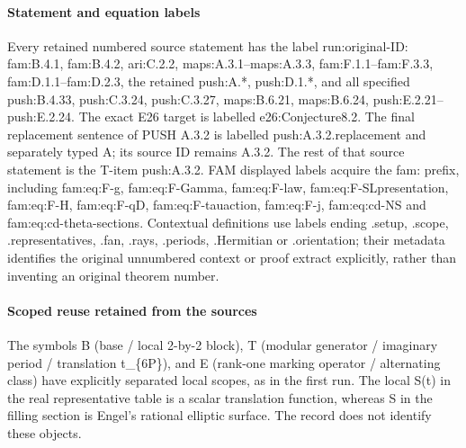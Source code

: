 \documentclass[11pt,a4paper]{article}
\theoremstyle{plain}
\theoremstyle{definition}
\begin{document}
\paragraph{Statement and equation labels}
Every retained numbered source statement has the label run:\allowbreak{}original-ID:\allowbreak{} fam:\allowbreak{}B.4.1, fam:\allowbreak{}B.4.2, ari:\allowbreak{}C.2.2, maps:\allowbreak{}A.3.1--maps:\allowbreak{}A.3.3, fam:\allowbreak{}F.1.1--fam:\allowbreak{}F.3.3, fam:\allowbreak{}D.1.1--fam:\allowbreak{}D.2.3, the retained push:\allowbreak{}A.*, push:\allowbreak{}D.1.*, and all specified push:\allowbreak{}B.4.33, push:\allowbreak{}C.3.24, push:\allowbreak{}C.3.27, maps:\allowbreak{}B.6.21, maps:\allowbreak{}B.6.24, push:\allowbreak{}E.2.21--push:\allowbreak{}E.2.24.
The exact E26 target is labelled e26:\allowbreak{}Conjecture8.2. The final replacement sentence of PUSH A.3.2 is labelled push:\allowbreak{}A.3.2.replacement and separately typed A; its source ID remains A.3.2. The rest of that source statement is the T-item push:\allowbreak{}A.3.2.
FAM displayed labels acquire the fam:\allowbreak{} prefix, including fam:\allowbreak{}eq:\allowbreak{}F-g, fam:\allowbreak{}eq:\allowbreak{}F-Gamma, fam:\allowbreak{}eq:\allowbreak{}F-law, fam:\allowbreak{}eq:\allowbreak{}F-SLpresentation, fam:\allowbreak{}eq:\allowbreak{}F-H, fam:\allowbreak{}eq:\allowbreak{}F-qD, fam:\allowbreak{}eq:\allowbreak{}F-tauaction, fam:\allowbreak{}eq:\allowbreak{}F-j, fam:\allowbreak{}eq:\allowbreak{}cd-NS and fam:\allowbreak{}eq:\allowbreak{}cd-theta-sections. Contextual definitions use labels ending .setup, .scope, .representatives, .fan, .rays, .periods, .Hermitian or .orientation; their metadata identifies the original unnumbered context or proof extract explicitly, rather than inventing an original theorem number.
\paragraph{Scoped reuse retained from the sources}
The symbols B (base /\allowbreak{} local 2-by-2 block), T (modular generator /\allowbreak{} imaginary period /\allowbreak{} translation t\_\allowbreak{}\{6P\}), and E (rank-one marking operator /\allowbreak{} alternating class) have explicitly separated local scopes, as in the first run. The local S(t) in the real representative table is a scalar translation function, whereas S in the filling section is Engel's rational elliptic surface. The record does not identify these objects.
\end{document}
